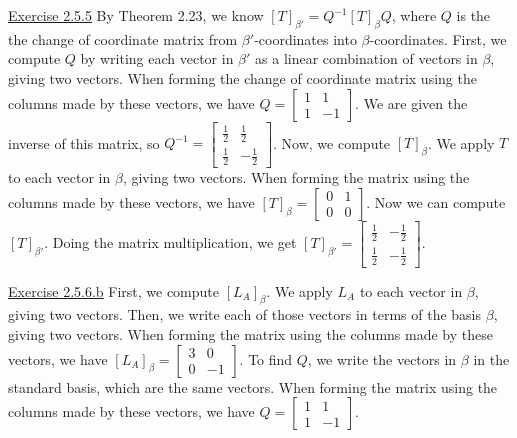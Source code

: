 \documentclass{exam}
\begin{document}
\underline{Exercise 2.5.5}
\newline
\newline
By Theorem 2.23, we know $[T]_{\beta'}=Q^{-1}[T]_\beta Q$, where $Q$ is the the change of coordinate matrix from $\beta'$-coordinates into $\beta$-coordinates. First, we compute $Q$ by writing each vector in $\beta'$ as a linear combination of vectors in $\beta$, giving two vectors. When forming the change of coordinate matrix using the columns made by these vectors, we have $Q=
\begin{bmatrix}
    1 & 1 \\
    1 & -1
\end{bmatrix}$. We are given the inverse of this matrix, so $Q^{-1}=
\begin{bmatrix}
    \frac{1}{2} & \frac{1}{2} \\
    \frac{1}{2} & -\frac{1}{2}
\end{bmatrix}$. Now, we compute $[T]_\beta$. We apply $T$ to each vector in $\beta$, giving two vectors. When forming the matrix using the columns made by these vectors, we have $[T]_\beta=
\begin{bmatrix}
    0 & 1 \\
    0 & 0
\end{bmatrix}$. Now we can compute $[T]_{\beta'}$. Doing the matrix multiplication, we get $[T]_{\beta'}=
\begin{bmatrix}
    \frac{1}{2} & -\frac{1}{2} \\
    \frac{1}{2} & -\frac{1}{2}
\end{bmatrix}$.
\newline

\underline{Exercise 2.5.6.b}
\newline
\newline
First, we compute $[L_A]_\beta$. We apply $L_A$ to each vector in $\beta$, giving two vectors. Then, we write each of those vectors in terms of the basis $\beta$, giving two vectors. When forming the matrix using the columns made by these vectors, we have $[L_A]_\beta=
\begin{bmatrix}
    3 & 0 \\
    0 & -1
\end{bmatrix}$. To find $Q$, we write the vectors in $\beta$ in the standard basis, which are the same vectors. When forming the matrix using the columns made by these vectors, we have $Q=
\begin{bmatrix}
    1 & 1 \\
    1 & -1
\end{bmatrix}$.
\newline
\end{document}

